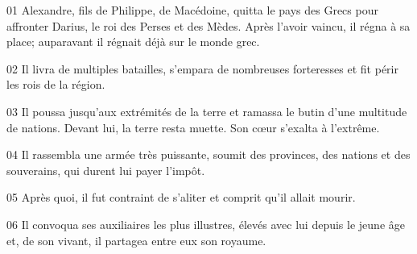 01 Alexandre, fils de Philippe, de Macédoine, quitta le pays des Grecs pour affronter Darius, le roi des Perses et des Mèdes. Après l’avoir vaincu, il régna à sa place; auparavant il régnait déjà sur le monde grec.

02 Il livra de multiples batailles, s’empara de nombreuses forteresses et fit périr les rois de la région.

03 Il poussa jusqu’aux extrémités de la terre et ramassa le butin d’une multitude de nations. Devant lui, la terre resta muette. Son cœur s’exalta à l’extrême.

04 Il rassembla une armée très puissante, soumit des provinces, des nations et des souverains, qui durent lui payer l’impôt.

05 Après quoi, il fut contraint de s’aliter et comprit qu’il allait mourir.

06 Il convoqua ses auxiliaires les plus illustres, élevés avec lui depuis le jeune âge et, de son vivant, il partagea entre eux son royaume.
